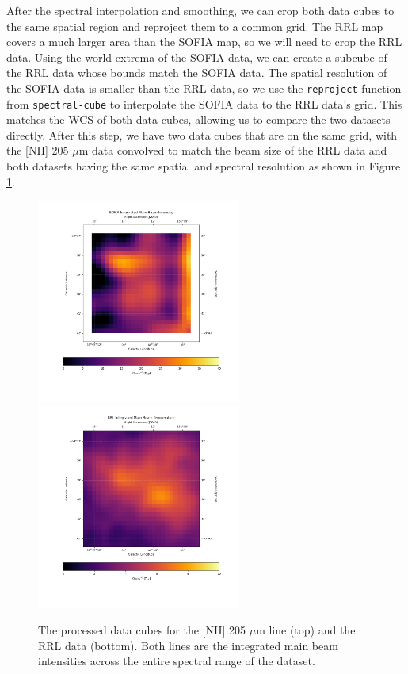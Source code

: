 After the spectral interpolation and smoothing, we can crop both data cubes to the same spatial region and reproject them to a common grid.
The RRL map covers a much larger area than the SOFIA map, so we will need to crop the RRL data.
Using the world extrema of the SOFIA data, we can create a subcube of the RRL data whose bounds match the SOFIA data.
The spatial resolution of the SOFIA data is smaller than the RRL data, so we use the \texttt{reproject} function from \texttt{spectral-cube} to interpolate the SOFIA data to the RRL data's grid.
This matches the WCS of both data cubes, allowing us to compare the two datasets directly.
After this step, we have two data cubes that are on the same grid, with the [NII] 205 $\mu$m data convolved to match the beam size of the RRL data and both datasets having the same spatial and spectral resolution as shown in Figure \ref{carina/fig:processed_data}.

\begin{figure}
    \centering
    \includegraphics[width=0.6\textwidth]{figs/carina/final_NII.png}
    \includegraphics[width=0.6\textwidth]{figs/carina/final_RRL.png}
    \caption[Preprocessed Data Cubes for {[}NII{]} and RRLs in the Carina Nebula]{
        The processed data cubes for the [NII] 205 $\mu$m line (top) and the RRL data (bottom).
        Both lines are the integrated main beam intensities across the entire spectral range of the dataset.
        }
    \label{carina/fig:processed_data}
\end{figure}

